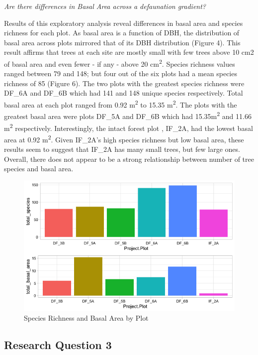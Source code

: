 \documentclass[
  12pt,
]{article}
\begin{document}
\emph{Are there differences in Basal Area across a defaunation
gradient?}

Results of this exploratory analysis reveal differences in basal area
and species richness for each plot. As basal area is a function of DBH,
the distribution of basal area across plots mirrored that of its DBH
distribution (Figure 4). This result affirms that trees at each site are
mostly small with few trees above 10 cm2 of basal area and even fewer -
if any - above 20 cm\textsuperscript{2}. Species richness values ranged
between 79 and 148; but four out of the six plots had a mean species
richness of 85 (Figure 6). The two plots with the greatest species
richness were DF\_6A and DF\_6B which had 141 and 148 unique species
respectively. Total basal area at each plot ranged from 0.92
m\textsuperscript{2} to 15.35 m\textsuperscript{2}. The plots with the
greatest basal area were plots DF\_5A and DF\_6B which had
15.35m\textsuperscript{2} and 11.66 m\textsuperscript{2} respectively.
Interestingly, the intact forest plot , IF\_2A, had the lowest basal
area at 0.92 m\textsuperscript{2}. Given IF\_2A's high species richness
but low basal area, these results seem to suggest that IF\_2A has many
small trees, but few large ones. Overall, there does not appear to be a
strong relationship between number of tree species and basal area.

\begin{figure}[H]
\includegraphics[width=0.95\linewidth]{./GoldenGriffithsKnierMalinowski_ENV872_Project_files/figure6} \caption{Species Richness and Basal Area by Plot}\label{fig:unnamed-chunk-9}
\end{figure}

\hypertarget{research-question-3-1}{%
\subsection{Research Question 3}\label{research-question-3-1}}
\end{document}
